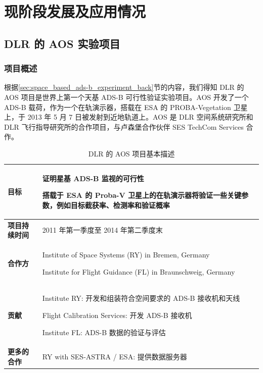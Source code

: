 
\chapter{现阶段发展及应用情况}

\section{DLR 的 AOS 实验项目}

\subsection{项目概述}

根据\ref{sec:space_based_ads-b_experiment_back}节的内容，我们得知 DLR 的 AOS 项目是世界上第一个天基 ADS-B 可行性验证实验项目。AOS 开发了一个 ADS-B 载荷，作为一个在轨演示器，搭载在 ESA 的 PROBA-Vegetation 卫星上，于 2013 年 5 月 7 日被发射到近地轨道上。AOS 是 DLR 空间系统研究所和 DLR 飞行指导研究所的合作项目，与卢森堡合作伙伴 SES TechCom Services 合作。

\renewcommand\arraystretch{1.5}
\begin{table}[!htb]
\centering
\caption{DLR 的 AOS 项目基本描述}
\label{tab:}
\begin{tabular}[b]{|p{2.2cm}<{\raggedleft}|p{13cm}<{\raggedright}|}
\hline
\textbf{目标} & 证明星基 ADS-B 监视的可行性 \par
            搭载于 ESA 的 Proba-V 卫星上的在轨演示器将验证一些关键参数，例如目标截获率、检测率和验证概率 \\
\hline
\textbf{项目持续时间} & 2011 年第一季度至 2014 年第二季度末 \\
\hline
\textbf{合作方} & Institute of Space Systems (RY) in Bremen, Germany \par\par
        Institute for Flight Guidance (FL) in Braunschweig, Germany \\
\hline
\textbf{贡献} & Institute RY: 开发和组装符合空间要求的 ADS-B 接收机和天线\par
Flight Calibration Services: 开发 ADS-B 接收机\par
Institute FL: ADS-B 数据的验证与评估 \\
\hline
\textbf{更多的合作} & RY with SES-ASTRA / ESA: 提供数据服务器 \\
\hline
\end{tabular}
\end{table}

